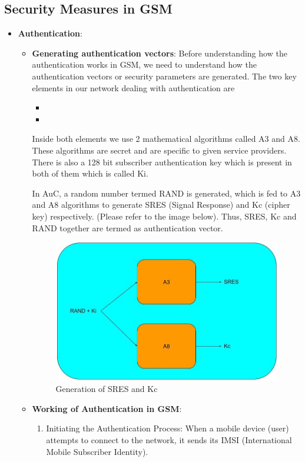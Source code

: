 \documentclass[conference]{IEEEtran}
\begin{document}
\subsection{Security Measures in GSM}
\begin{itemize}
    \item \textbf{Authentication}: 
    
    \begin{itemize}
        
        \item \textbf{Generating authentication vectors}:
        Before understanding how the authentication works in GSM, we need to understand how the authentication vectors or security parameters are generated.
        The two key elements in our network dealing with authentication are 
        \begin{itemize}
            \item {}
            \item {}
        \end{itemize}
        Inside both elements we use 2 mathematical algorithms called A3 and A8. These algorithms are secret and are specific to given service providers. There is also a 128 bit subscriber authentication key which is present in both of them which is called Ki. 
    
        In AuC, a random number termed RAND is generated, which is fed to A3 and A8 algorithms to generate SRES (Signal Response) and Kc (cipher key)  respectively. (Please refer to the image below).
        Thus, SRES, Kc and RAND together are termed as authentication vector. \cite{kaur2012review}

        \begin{figure}
            \centering
            \includegraphics[width=0.5\linewidth]{Assets/GSM-Auth-1.jpg}
            \caption{Generation of SRES and Kc}
            \label{fig:enter-label}
        \end{figure}

        \item \textbf{Working of Authentication in GSM}:
        \begin{enumerate}
            \item Initiating the Authentication Process:
            When a mobile device (user) attempts to connect to the network, it sends its IMSI (International Mobile Subscriber Identity).


\end{enumerate}
\end{itemize}
\end{itemize}
\end{document}
